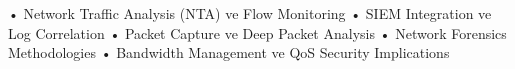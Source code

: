 • Network Traffic Analysis (NTA) ve Flow Monitoring
• SIEM Integration ve Log Correlation
• Packet Capture ve Deep Packet Analysis
• Network Forensics Methodologies
• Bandwidth Management ve QoS Security Implications
